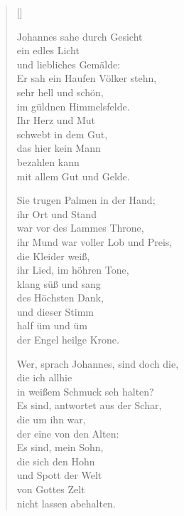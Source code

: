 \begin{multicols}{2}
\settowidth{\versewidth}{Wer, sprach Johannes, sind doch die,}
\begin{verse}[\versewidth]

 Johannes sahe durch Gesicht\\
ein edles Licht\\
und liebliches Gemälde:\\
Er sah ein Haufen Völker stehn,\\
sehr hell und schön,\\
im güldnen Himmelsfelde.\\
Ihr Herz und Mut\\
schwebt in dem Gut,\\
das hier kein Mann\\
bezahlen kann\\
mit allem Gut und Gelde.

 Sie trugen Palmen in der Hand;\\
ihr Ort und Stand\\
war vor des Lammes Throne,\\
ihr Mund war voller Lob und Preis,\\
die Kleider weiß,\\
ihr Lied, im höhren Tone,\\
klang süß und sang\\
des Höchsten Dank,\\
und dieser Stimm\\
half üm und üm\\
der Engel heilge Krone.

 Wer, sprach Johannes, sind doch die,\\
die ich allhie\\
in weißem Schmuck seh halten?\\
Es sind, antwortet aus der Schar,\\
die um ihn war,\\
der eine von den Alten:\\
Es sind, mein Sohn,\\
die sich den Hohn\\
und Spott der Welt\\
von Gottes Zelt\\
nicht lassen abehalten.


\end{verse}
\end{multicols}
